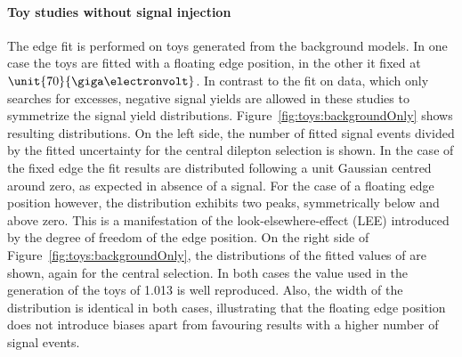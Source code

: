 \paragraph{Toy studies without signal injection}
The edge fit is performed on toys generated from the background models. In one case the toys are fitted with a floating edge position, in the other it fixed at $\unit{70}{\giga\electronvolt}$. In contrast to the fit on data, which only searches for excesses, negative signal yields are allowed in these studies to symmetrize the signal yield distributions. Figure~\ref{fig:toys:backgroundOnly} shows resulting distributions. On the left side, the number of fitted signal events divided by the fitted uncertainty for the central dilepton selection is shown. In the case of the fixed edge the fit results are distributed following a unit Gaussian centred around zero, as expected in absence of a signal.  For the case of a floating edge position however, the distribution exhibits two peaks, symmetrically below and above zero. This is a manifestation of the look-elsewhere-effect (LEE) introduced by the degree of freedom of the edge position. On the right side of Figure~\ref{fig:toys:backgroundOnly}, the distributions of the fitted values of \Rsfof are shown, again for the central selection. In both cases the value used in the generation of the toys of 1.013 is well reproduced. Also, the width of the distribution is identical in both cases,  illustrating that the floating edge position does not introduce biases apart from favouring results with a higher number of signal events.
